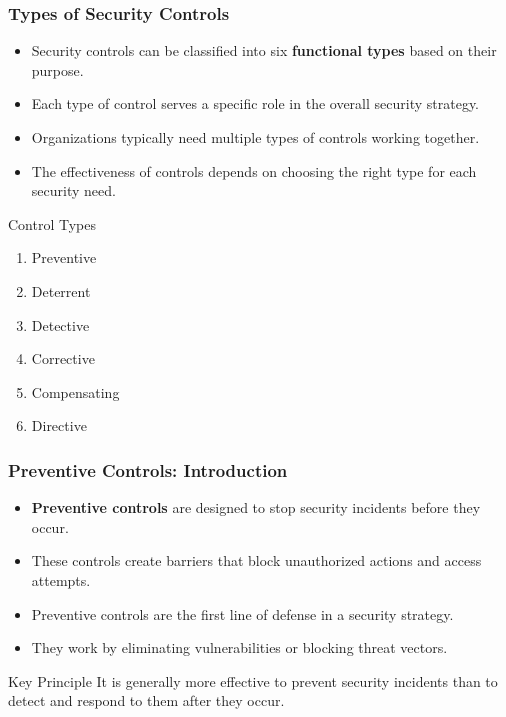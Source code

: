 \documentclass{beamer}
\begin{document}
\begin{frame}
    \frametitle{Types of Security Controls}
    
    \begin{itemize}
        \item Security controls can be classified into six \textbf{functional types} based on their purpose.
        
        \item Each type of control serves a specific role in the overall security strategy.
        
        \item Organizations typically need multiple types of controls working together.
        
        \item The effectiveness of controls depends on choosing the right type for each security need.
    \end{itemize}
    
    \begin{block}{Control Types}
        \begin{enumerate}
            \item Preventive
            \item Deterrent
            \item Detective
            \item Corrective
            \item Compensating
            \item Directive
        \end{enumerate}
    \end{block}
\end{frame}

\begin{frame}
    \frametitle{Preventive Controls: Introduction}
    
    \begin{itemize}
        \item \textbf{Preventive controls} are designed to stop security incidents before they occur.
        
        \item These controls create barriers that block unauthorized actions and access attempts.
        
        \item Preventive controls are the first line of defense in a security strategy.
        
        \item They work by eliminating vulnerabilities or blocking threat vectors.
    \end{itemize}
    
    \begin{alertblock}{Key Principle}
        It is generally more effective to prevent security incidents than to detect and respond to them after they occur.
    \end{alertblock}
\end{frame}
\end{document}

